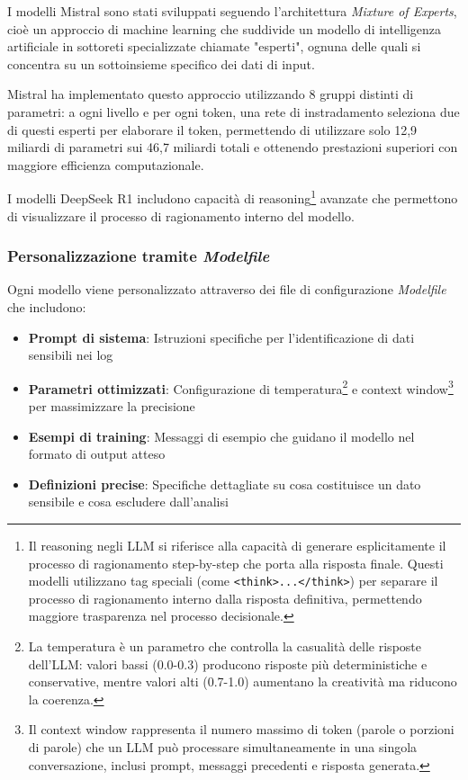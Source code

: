 \documentclass[12pt]{report}
\begin{document}
I modelli Mistral sono stati sviluppati seguendo l'architettura \textit{Mixture of Experts}, cioè un approccio di machine learning che suddivide un modello di intelligenza artificiale in sottoreti specializzate chiamate "esperti", ognuna delle quali si concentra su un sottoinsieme specifico dei dati di input.~\cite{mu2025moe_survey}~\cite{ibm_moe}

Mistral ha implementato questo approccio utilizzando 8 gruppi distinti di parametri: a ogni livello e per ogni token, una rete di instradamento seleziona due di questi esperti per elaborare il token, permettendo di utilizzare solo 12,9 miliardi di parametri sui 46,7 miliardi totali e ottenendo prestazioni superiori con maggiore efficienza computazionale.~\cite{mistral_moe}

I modelli DeepSeek R1 includono capacità di reasoning\footnote{Il reasoning negli LLM si riferisce alla capacità di generare esplicitamente il processo di ragionamento step-by-step che porta alla risposta finale. Questi modelli utilizzano tag speciali (come \texttt{<think>...</think>}) per separare il processo di ragionamento interno dalla risposta definitiva, permettendo maggiore trasparenza nel processo decisionale.} avanzate che permettono di visualizzare il processo di ragionamento interno del modello.

\subsubsection{Personalizzazione tramite \textit{Modelfile}}
Ogni modello viene personalizzato attraverso dei file di configurazione \textit{Modelfile} che includono:

\begin{itemize}
    \item \textbf{Prompt di sistema}: Istruzioni specifiche per l'identificazione di dati sensibili nei log
    \item \textbf{Parametri ottimizzati}: Configurazione di temperatura\footnote{La temperatura è un parametro che controlla la casualità delle risposte dell'LLM: valori bassi (0.0-0.3) producono risposte più deterministiche e conservative, mentre valori alti (0.7-1.0) aumentano la creatività ma riducono la coerenza.} e context window\footnote{Il context window rappresenta il numero massimo di token (parole o porzioni di parole) che un LLM può processare simultaneamente in una singola conversazione, inclusi prompt, messaggi precedenti e risposta generata.} per massimizzare la precisione
    \item \textbf{Esempi di training}: Messaggi di esempio che guidano il modello nel formato di output atteso
    \item \textbf{Definizioni precise}: Specifiche dettagliate su cosa costituisce un dato sensibile e cosa escludere dall'analisi
\end{itemize}
\end{document}
